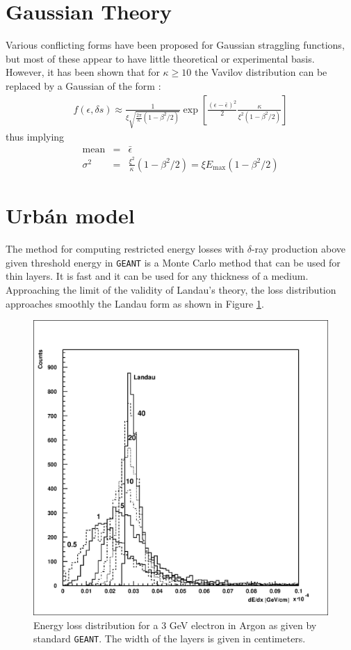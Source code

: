 \documentclass{article}
\newcommand{\Emax}{\ensuremath{E_{\mathrm{max}}}}
\newcommand{\GEANT}{\texttt{GEANT}}
\begin{document}
\section{Gaussian Theory}
 
Various conflicting forms have been proposed for Gaussian straggling
functions, but most of these appear to have little theoretical or
experimental basis.  However, it has been shown\cite{bib-SELT} that
for $\kappa \geq 10 $ the Vavilov distribution can be replaced by a
Gaussian of the form :
\begin{eqnarray*}
f( \epsilon , \delta s)  \approx \frac{1}
{\xi \sqrt{\frac{2 \pi}{\kappa} \left( 1 - \beta^2/2 \right)}}
   \exp \left [ \frac{( \epsilon - \bar{\epsilon} )^2}{2} \frac{\kappa}
   {\xi^2 (1- \beta^2/2)}\right ]
\end{eqnarray*}
thus implying 
\begin{eqnarray*}
\mathrm{mean} & = & \bar{\epsilon} \\
\sigma^2      & = & \frac{\xi^2}{\kappa} (1-\beta^2/2) = \xi
                    \Emax (1-\beta^2/2)
\end{eqnarray*}

\section{Urb\'an model}
\label{urban}

The method for computing restricted energy losses with $\delta$-ray
production above given threshold energy in \GEANT{} is a Monte
Carlo method that can be used for thin layers.  It is fast and it can
be used for any thickness of a medium.  Approaching the limit of the
validity of Landau's theory, the loss distribution approaches smoothly
the Landau form as shown in Figure \ref{fg:phys332-2}.
\begin{figure}
   \centering
   \includegraphics[width=.6\linewidth]{phys332-2}
   \caption{Energy loss distribution for a 3 GeV electron in
     Argon as given by standard \GEANT.  The width of the layers is
     given in centimeters.}
    \label{fg:phys332-2}
\end{figure}
\end{document}
